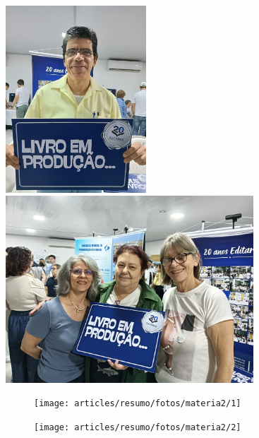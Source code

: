 \documentclass{gescons}
\begin{document}
  \begin{center}
    \includegraphics[height=7cm]{articles/resumo/fotos/materia2/IMG20241208144653.jpg}
    \hspace{2.5mm}
    \includegraphics[height=7cm]{articles/resumo/fotos/materia2/IMG20241208155101.jpg}
  \end{center}




\clearpage %
\begin{figure}[p] %
  \centering
  \texttt{[image: articles/resumo/fotos/materia2/1]}
  \caption*{} %
\end{figure}
\clearpage

\clearpage %
\begin{figure}[p] %
  \centering
  \texttt{[image: articles/resumo/fotos/materia2/2]}
  \caption*{} %
\end{figure}
\clearpage

        
\end{document}
